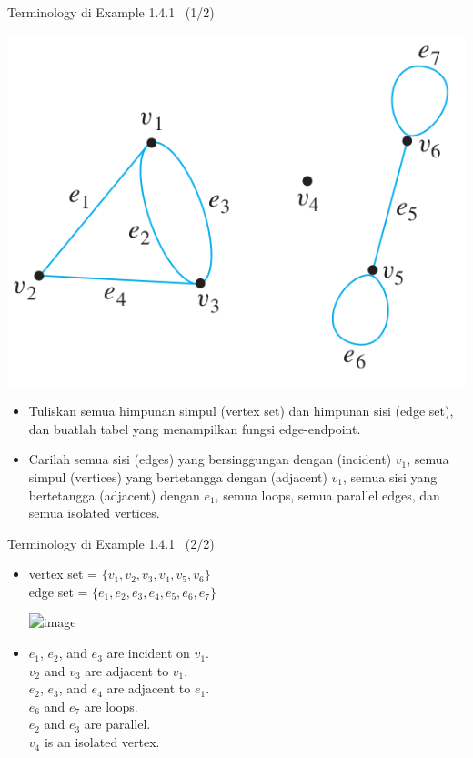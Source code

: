 \documentclass[english,t]{beamer}
\renewcommand{\emph}[1]{\textcolor{navyblue}{#1}}
\begin{document}
\begin{frame}{Terminology di Example 1.4.1~\citep{epp2020discrete} (1/2)}
	\begin{center}
		\includegraphics[scale=.25]{images/Example10-1-1}
	\end{center}
	\vspace*{-0.5cm}		
	\begin{itemize}
		\item<2-> Tuliskan semua himpunan simpul (\emph{vertex set}) dan himpunan sisi (\emph{edge set}), dan buatlah tabel yang menampilkan fungsi \emph{edge-endpoint}.
		\item<3-> Carilah semua sisi (\emph{edges}) yang bersinggungan dengan (\emph{incident}) $v_1$, semua simpul (\emph{vertices}) yang bertetangga dengan (\emph{adjacent}) $v_1$, semua sisi yang bertetangga (\emph{adjacent}) dengan $e_1$, semua \emph{loops}, semua \emph{parallel edges}, dan semua \emph{isolated vertices}.
	\end{itemize}
\end{frame}

\begin{frame}{Terminology di Example 1.4.1~\citep{epp2020discrete} (2/2)}
	\begin{itemize}
		\item<2-> vertex set = $\{ v_1, v_2, v_3, v_4, v_5, v_6 \}$ \\
		edge set = $\{ e_1, e_2, e_3, e_4, e_5, e_6, e_7 \}$ \\
		\begin{center}
			\includegraphics<3->[scale=.125]{images/fungsi-edge-to-point}				
		\end{center}
		\item<3-> $e_1$, $e_2$, and $e_3$ are incident on $v_1$. \\
		$v_2$ and $v_3$ are adjacent to $v_1$. \\
		$e_2$, $e_3$, and $e_4$ are adjacent to $e_1$. \\
		$e_6$ and $e_7$ are loops. \\
		$e_2$ and $e_3$ are parallel. \\
		$v_4$ is an isolated vertex. 		
	\end{itemize}
	
\end{frame}
\end{document}
